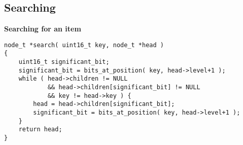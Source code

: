 \subsection{Searching}
\begin{frame}[fragile]
    \textbf{Searching for an item}
    \begin{verbatim}
node_t *search( uint16_t key, node_t *head )
{
    uint16_t significant_bit;
    significant_bit = bits_at_position( key, head->level+1 );
    while ( head->children != NULL
            && head->children[significant_bit] != NULL
            && key != head->key ) {
        head = head->children[significant_bit];
        significant_bit = bits_at_position( key, head->level+1 );
    }
    return head;
}
    \end{verbatim}
\end{frame}
